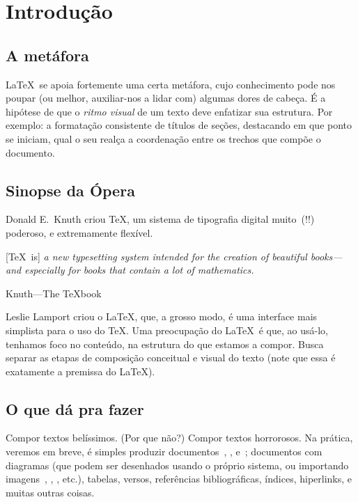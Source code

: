 \section{Introdução}

\subsection{A metáfora}

\LaTeX\ se apoia fortemente uma certa metáfora, cujo conhecimento pode
nos poupar (ou melhor, auxiliar-nos a lidar com) algumas dores de
cabeça. É a hipótese de que o \emph{ritmo visual} de um texto deve
enfatizar sua estrutura. Por exemplo: a formatação consistente de
títulos de seções, destacando em que ponto se iniciam, qual o seu
realça a coordenação entre os trechos que compõe o documento.


\subsection{Sinopse da Ópera}

Donald E.~Knuth criou \TeX, um sistema de tipografia digital muito~(!!)
poderoso, e extremamente flexível.

\begin{center}
\begin{minipage}{.75\textwidth}
  [\TeX\ is] \textit{a new typesetting system intended for the creation of
  beautiful books---and especially for books that contain a lot of
  mathematics.}

  \hfill Knuth---The \TeX book
\end{minipage}
\end{center}

  
Leslie Lamport criou o \LaTeX, que, a grosso modo, é uma interface
mais simplista para o uso do \TeX. Uma preocupação do \LaTeX\ é que,
ao usá-lo, tenhamos foco no conteúdo, na estrutura do que estamos a
compor. Busca separar as etapas de composição conceitual e visual do
texto (note que essa é exatamente a premissa do \LaTeX).  

\subsection{O que dá pra fazer}

Compor textos belíssimos. (Por que não?) Compor textos horrorosos. Na
prática, veremos em breve, é simples produzir
documentos~, , e~; documentos
com diagramas (que podem ser desenhados usando o próprio sistema, ou
importando imagens~, , ,
etc.), tabelas, versos, referências bibliográficas, índices,
hiperlinks, e muitas outras coisas.

